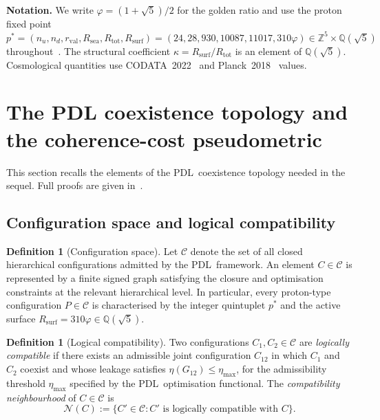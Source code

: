 \documentclass[11pt,a4paper]{article}
\theoremstyle{definition}
\newtheorem{definition}[theorem]{Definition}
\newcommand{\PDL}{\textnormal{PDL}}
\newcommand{\Rsurf}{R_{\mathrm{surf}}}
\newcommand{\Rsea}{R_{\mathrm{sea}}}
\newcommand{\Rtot}{R_{\mathrm{tot}}}
\newcommand{\rval}{r_{\mathrm{val}}}
\newcommand{\vp}{\varphi}
\newcommand{\kap}{\kappa}
\newcommand{\Cconf}{\mathcal{C}}
\begin{document}
\medskip\noindent\textbf{Notation.} We write $\vp = (1+\sqrt{5})/2$ for the golden ratio and use the proton fixed point $p^* = (n_u,n_d,\rval,\Rsea,\Rtot,\Rsurf) = (24,28,930,10087,11017,310\vp) \in \mathbb{Z}^5 \times \mathbb{Q}(\sqrt{5})$ throughout~\cite{PDL_Bridge_2026}. The structural coefficient $\kap = \Rsurf/\Rtot$ is an element of $\mathbb{Q}(\sqrt{5})$. Cosmological quantities use CODATA~2022~\cite{CODATA_2022} and Planck~2018~\cite{Planck_2018} values.

\section{The PDL coexistence topology and the coherence-cost pseudometric}
\label{sec:coexistence}

This section recalls the elements of the \PDL\ coexistence topology needed in the sequel. Full proofs are given in~\cite{Topological_Reformulation_PDL_2026}.

\subsection{Configuration space and logical compatibility}
\label{subsec:config}

\begin{definition}[Configuration space]
\label{def:config_space}
Let $\Cconf$ denote the set of all closed hierarchical configurations admitted by the \PDL\ framework. An element $C \in \Cconf$ is represented by a finite signed graph satisfying the closure and optimisation constraints at the relevant hierarchical level. In particular, every proton-type configuration $P \in \Cconf$ is characterised by the integer quintuplet $p^*$ and the active surface $\Rsurf = 310\vp \in \mathbb{Q}(\sqrt{5})$.
\end{definition}

\begin{definition}[Logical compatibility]
\label{def:compatibility}
Two configurations $C_1, C_2 \in \Cconf$ are \emph{logically compatible} if there exists an admissible joint configuration $C_{12}$ in which $C_1$ and $C_2$ coexist and whose leakage satisfies $\eta(G_{12}) \leq \eta_{\max}$, for the admissibility threshold $\eta_{\max}$ specified by the \PDL\ optimisation functional. The \emph{compatibility neighbourhood} of $C \in \Cconf$ is
\[
  \mathcal{N}(C) := \{ C' \in \Cconf : C' \text{ is logically compatible with } C \}.
\]
\end{definition}
\end{document}
